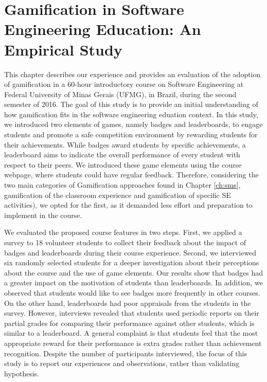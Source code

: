 \chapter{Gamification in Software Engineering Education:
An Empirical Study}
\label{ch:gamificationexperiment}

This chapter describes our experience and provides an evaluation of the adoption of gamification in a 60-hour introductory course on Software Engineering at Federal University of Minas Gerais (UFMG), in Brazil, during the second semester of 2016. The goal of this study is to provide an initial understanding of how gamification fits in the software engineering eduation context. In this study, we introduced two elements of games, namely badges and leaderboards, to engage students and promote a safe competition environment by rewarding students for their achievements. While badges award students by specific achievements, a leaderboard aims to indicate the overall performance of every student with respect to their peers. We introduced these game elements using the course webpage, where students could have regular feedback. Therefore, considering the two main categories of Gamification approaches found in Chapter \ref{ch:sms}, gamification of the classroom experience and gamification of specific SE activities), we opted for the first, as it demanded less effort and preparation to implement in the course.

We evaluated the proposed course features in two steps. First, we applied a survey to 18 volunteer students to collect their feedback about the impact of badges and leaderboards during their course experience. Second, we interviewed six randomly selected students for a deeper investigation about their perceptions about the course and the use of game elements. Our results show that badges had a greater impact on the motivation of students than leaderboards. In addition, we observed that students would like to see badges more frequently in other courses. On the other hand, leaderboards had poor appraisals from the students in the survey. However, interviews revealed that students used periodic reports on their partial grades for comparing their performance against other students, which is similar to a leaderboard. A general complaint is that students feel that the most appropriate reward for their performance is extra grades rather than achievement recognition. Despite the number of participants interviewed, the focus of this study is to report our experiences and observations, rather than validating hypothesis.

